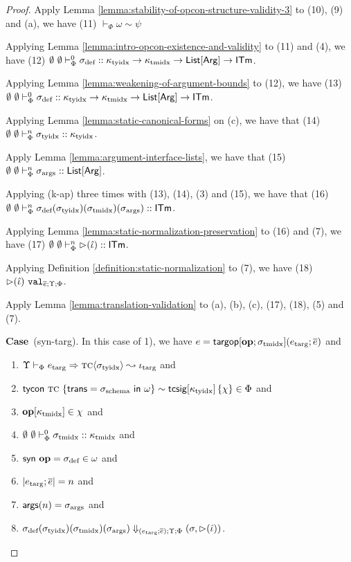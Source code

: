 \documentclass[12pt]{article}
\newcommand{\pfcase}[1]{\textbf{Case}~#1. }
\begin{document}
\begin{proof}
Apply Lemma \ref{lemma:stability-of-opcon-structure-validity-3} to (10), (9) and (a), we have (11) $\vdash_{\Phi} \omega \sim \psi$

Applying Lemma \ref{lemma:intro-opcon-existence-and-validity} to (11) and (4), we have (12) $\emptyset~\emptyset \vdash_{\Phi}^{0} \sigma_\text{def} :: \kappa_\text{tyidx} \rightarrow \kappa_\text{tmidx} \rightarrow {\sf List}[{\sf Arg}] \rightarrow {\sf ITm}$. 

Applying Lemma \ref{lemma:weakening-of-argument-bounds} to (12), we have (13) $\emptyset~\emptyset \vdash_{\Phi}^{0} \sigma_\text{def} :: \kappa_\text{tyidx} \rightarrow \kappa_\text{tmidx} \rightarrow {\sf List}[{\sf Arg}] \rightarrow {\sf ITm}$. 

Applying Lemma \ref{lemma:static-canonical-forms} on (c), we have that (14) $\emptyset~\emptyset \vdash_{\Phi}^{n} \sigma_\text{tyidx} :: \kappa_\text{tyidx}$.

Apply Lemma \ref{lemma:argument-interface-lists}, we have that (15) $\emptyset~\emptyset \vdash_{\Phi}^{n} \sigma_\text{args} :: {\sf List}[{\sf Arg}]$.

Applying (k-ap) three times with (13), (14), (3) and (15), we have that (16) $\emptyset~\emptyset \vdash_{\Phi}^{n} \sigma_\text{def}(\sigma_\text{tyidx})(\sigma_\text{tmidx})(\sigma_\text{args}) :: {\sf ITm}$.

Applying Lemma \ref{lemma:static-normalization-preservation} to (16) and (7), we have (17) $\emptyset~\emptyset \vdash_{\Phi}^{n} {\rhd}(\hat{\iota}) :: {\sf ITm}$.

Applying Definition \ref{definition:static-normalization} to (7), we have (18) ${\rhd}(\hat{\iota})~\mathtt{val}_{\overline{e};\Upsilon;\Phi}$.

Apply Lemma \ref{lemma:translation-validation} to (a), (b), (c), (17), (18), (5) and (7).

\pfcase{(syn-targ)} In this case of 1), we have $e={\sf targop}[\textbf{op}; \sigma_\text{tmidx}](e_\text{targ}; \overline{e})$ and \begin{enumerate}[(1)]
\item $\Upsilon \vdash_{\Phi} e_\text{targ} \Rightarrow {\textsc{tc}}\langle\sigma_\text{tyidx}\rangle \leadsto \iota_\text{targ}$ and 
\item ${\sf tycon}~\textsc{tc} ~\{{\sf trans}=\sigma_\text{schema}~{\sf in}~\omega\} \sim {\sf tcsig}[\kappa_\text{tyidx}]\,\{\chi\} \in \Phi$ and
\item $\textbf{op}[\kappa_\text{tmidx}] \in \chi$ and
\item $\emptyset~\emptyset \vdash_{\Phi}^{0} \sigma_\text{tmidx} :: \kappa_\text{tmidx}$ and
\item ${\sf syn~}\textbf{op}={\sigma_\text{def}} \in \omega$ and
\item $|e_\text{targ}; \overline{e}| = n$ and
\item ${\sf args}(n)=\sigma_\text{args}$ and
\item $\sigma_\text{def}(\sigma_\text{tyidx})(\sigma_\text{tmidx})(\sigma_\text{args}) \Downarrow_{(e_\text{targ}; \overline{e});\Upsilon;\Phi} (\sigma, {\rhd}(\hat{\iota}))$.
\end{enumerate}


\end{proof}
\end{document}
